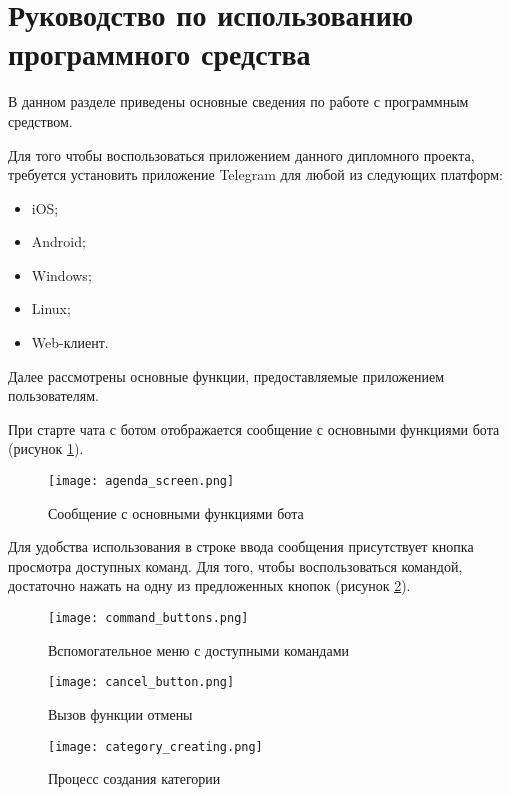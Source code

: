\section{Руководство по использованию программного средства}
\label{sec:manual}

В данном разделе приведены основные сведения по работе с программным средством.

Для того чтобы воспользоваться приложением данного дипломного проекта, требуется установить приложение Telegram для любой из следующих платформ:

\begin{itemize}
	\item iOS;
	\item Android;
	\item Windows;
	\item Linux;
	\item Web-клиент.
\end{itemize}

Далее рассмотрены основные функции, предоставляемые приложением пользователям.

При старте чата с ботом отображается сообщение с основными функциями бота (рисунок \ref{fig:manual:agenda_screen}).

\begin{figure}[ht]
\centering
	\texttt{[image: agenda\_screen.png]}
	\caption{Сообщение с основными функциями бота}
	\label{fig:manual:agenda_screen}
\end{figure}

Для удобства использования в строке ввода сообщения присутствует кнопка просмотра доступных команд. Для того, чтобы воспользоваться командой, достаточно нажать на одну из предложенных кнопок (рисунок \ref{fig:manual:command_buttons}).

\begin{figure}[!h]
\centering
	\texttt{[image: command\_buttons.png]}
	\caption{Вспомогательное меню с доступными командами}
	\label{fig:manual:command_buttons}
\end{figure}

\begin{figure}[!h]
\centering
	\texttt{[image: cancel\_button.png]}
	\caption{Вызов функции отмены}
	\label{fig:manual:cancel_button}
\end{figure}

\begin{figure}[!h]
\centering
	\texttt{[image: category\_creating.png]}
	\caption{Процесс создания категории}
	\label{fig:manual:category_creating}
\end{figure}

